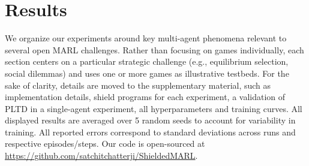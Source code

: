 \documentclass{ecai}
\theoremstyle{plain}
\theoremstyle{definition}
\theoremstyle{remark}
\begin{document}





\section{Results}

We organize our experiments around key multi-agent phenomena relevant to several open MARL challenges. Rather than focusing on games individually, each section centers on a particular strategic challenge (e.g., equilibrium selection, social dilemmas) and uses one or more games as illustrative testbeds. For the sake of clarity, details are moved to the supplementary material, such as implementation details, shield programs for each experiment, a validation of PLTD in a single-agent experiment, all hyperparameters and training curves. All displayed results are averaged over 5 random seeds to account for variability in training. All reported errors correspond to standard deviations across runs and respective episodes/steps. Our code is open-sourced at \url{https://github.com/satchitchatterji/ShieldedMARL}.
\end{document}
